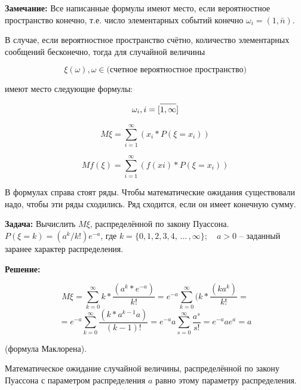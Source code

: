 \documentclass[a4paper,12pt]{report}
\newcommand*{\task}[1]{\rule{0pt}{10mm}\textbf{#1}}
\newcommand*{\rtask}[1]{\rule{0pt}{10mm}\textbf{#1}}
\newcommand*{\comm}[1]{\rule{0pt}{10mm}\textbf{#1}}
\newcommand{\sudots}{\,\ldots\,}
\begin{document}
	\comm{Замечание:} Все написанные формулы имеют место, если вероятностное пространство конечно, т.е. число элементарных событий конечно $\omega_i = (1,\bar n)$. 

	В случае, если вероятностное пространство счётно, количество элементарных сообщений бесконечно, тогда для случайной величины 
	
	$$
	  \xi(\omega), 
	  \omega \in \mbox{(счетное вероятностное пространство)}
	$$

	имеют место следующие формулы:

	$$
	  \omega_i, i = [\overline{1,\strut\infty}]
	$$

	$$
	  M\xi = \sum^\infty_{i=1}(x_i*P(\xi=x_i))
	$$

	$$
	  Mf(\xi) = \sum^\infty_{i=1}(f(xi)*P(\xi=x_i))
	$$

	В формулах справа стоят ряды. Чтобы математические ожидания существовали надо, чтобы эти ряды сходились. Ряд сходится, если он имеет конечную сумму.

	
	\task{Задача:} Вычислить $M\xi$, распределённой по закону Пуассона. $P(\xi=k)=(a^k/k!)e^{-a}$,
	  где $k=\{0,1,2,3,4, \sudots ,\infty\};\quad a>0$ – заданный заранее характер распределения. 

	\rtask{Решение:} 

	$$
	  M\xi = \sum^\infty_{k=0}k*\frac{(a^k*e^{-a})}{k!}
	       = e^{-a}\sum^\infty_{k=0}(k*\frac{(ka^k)}{k!}
	       =
	$$ $$
	       = e^{-a}\sum^\infty_{k=0}\frac{(k*a^{k-1}a)}{(k-1)!}
	       = e^{-a}a\sum^\infty_{s=0}\frac{a^s}{s!} 
	       = e^{-a}ae^a = a
	$$ 
	
	(формула Маклорена).

	Математическое ожидание случайной величины,  распределённой по закону Пуассона с параметром распределения $a$ равно этому параметру распределения.
\end{document}
